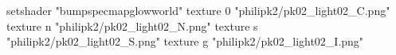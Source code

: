 setshader "bumpspecmapglowworld"
    texture 0 "philipk2/pk02_light02_C.png"
    texture n "philipk2/pk02_light02_N.png"
    texture s "philipk2/pk02_light02_S.png"
    texture g "philipk2/pk02_light02_I.png"